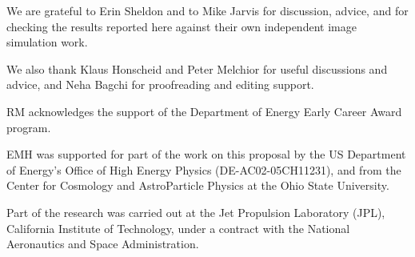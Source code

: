 \documentclass[iop]{emulateapj}
\begin{document}
We are grateful to Erin Sheldon and to Mike Jarvis for
discussion, advice, and for checking the results reported here against
their own independent image simulation work.

We also thank Klaus Honscheid and Peter Melchior for useful
discussions and advice, and Neha Bagchi for proofreading and editing
support.

RM acknowledges the support of the Department of Energy Early Career
Award program.

EMH was supported for part of the work on this proposal by the US
Department of Energy’s Office of High Energy Physics
(DE-AC02-05CH11231), and from the Center for Cosmology and
AstroParticle Physics at the Ohio State University.

Part of the research was carried out at the Jet Propulsion Laboratory
(JPL), California Institute of Technology, under a contract with the
National Aeronautics and Space Administration.



\end{document}
